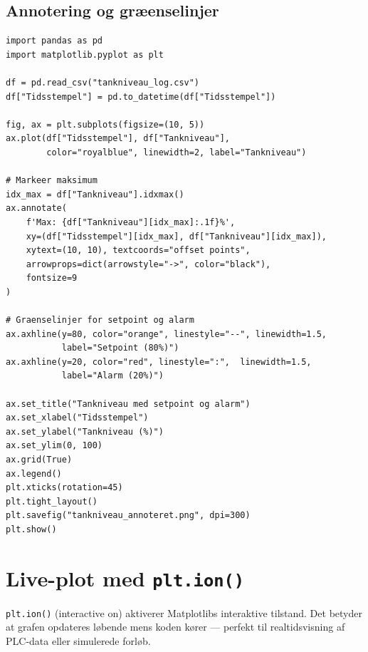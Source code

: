 \documentclass[12pt, a4paper]{article}
\begin{document}
\subsection{Annotering og græenselinjer}

\begin{tcolorbox}[pythonbox, title={\faPython\quad Kode 3 --- Annotation og tarskellinjer}]
\begin{verbatim}
import pandas as pd
import matplotlib.pyplot as plt

df = pd.read_csv("tankniveau_log.csv")
df["Tidsstempel"] = pd.to_datetime(df["Tidsstempel"])

fig, ax = plt.subplots(figsize=(10, 5))
ax.plot(df["Tidsstempel"], df["Tankniveau"],
        color="royalblue", linewidth=2, label="Tankniveau")

# Markeer maksimum
idx_max = df["Tankniveau"].idxmax()
ax.annotate(
    f'Max: {df["Tankniveau"][idx_max]:.1f}%',
    xy=(df["Tidsstempel"][idx_max], df["Tankniveau"][idx_max]),
    xytext=(10, 10), textcoords="offset points",
    arrowprops=dict(arrowstyle="->", color="black"),
    fontsize=9
)

# Graenselinjer for setpoint og alarm
ax.axhline(y=80, color="orange", linestyle="--", linewidth=1.5,
           label="Setpoint (80%)")
ax.axhline(y=20, color="red", linestyle=":",  linewidth=1.5,
           label="Alarm (20%)")

ax.set_title("Tankniveau med setpoint og alarm")
ax.set_xlabel("Tidsstempel")
ax.set_ylabel("Tankniveau (%)")
ax.set_ylim(0, 100)
ax.grid(True)
ax.legend()
plt.xticks(rotation=45)
plt.tight_layout()
plt.savefig("tankniveau_annoteret.png", dpi=300)
plt.show()
\end{verbatim}
\end{tcolorbox}
\clearpage
\section{Live-plot med \texttt{plt.ion()}}

\texttt{plt.ion()} (interactive on) aktiverer Matplotlibs interaktive tilstand.
Det betyder at grafen opdateres løbende mens koden kører --- perfekt til
realtidsvisning af PLC-data eller simulerede forløb.
\end{document}
